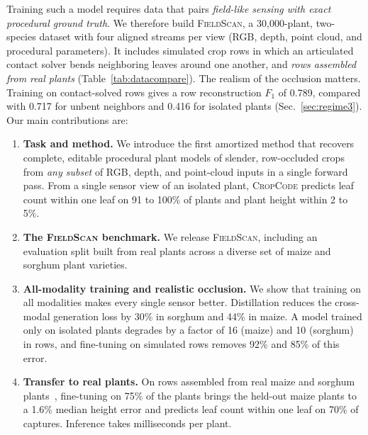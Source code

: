 \documentclass[10pt,twocolumn,letterpaper]{article}
\newcommand{\method}{\textsc{CropCode}}
\newcommand{\dataset}{\textsc{FieldScan}}
\begin{document}
Training such a model requires data that pairs \textit{field-like sensing with exact procedural ground truth}. We therefore build \dataset{}, a 30{,}000-plant, two-species dataset with four aligned streams per view (RGB, depth, point cloud, and procedural parameters). It includes simulated crop rows in which an articulated contact solver bends neighboring leaves around one another, and \textit{rows assembled from real plants }(Table~\ref{tab:datacompare}). The realism of the occlusion matters. Training on contact-solved rows gives a row reconstruction $F_1$ of 0.789, compared with 0.717 for unbent neighbors and 0.416 for isolated plants (Sec.~\ref{sec:regime3}). Our main contributions are:
\begin{enumerate}
  \item \textbf{Task and method.} We introduce the first amortized method that recovers complete, editable procedural plant models of slender, row-occluded crops from \emph{any subset} of RGB, depth, and point-cloud inputs in a single forward pass. From a single sensor view of an isolated plant, \method{} predicts leaf count within one leaf on 91 to 100\% of plants and plant height within 2 to 5\%.
  \item \textbf{The \dataset{} benchmark.} We release \dataset{}, including an evaluation split built from real plants across a diverse set of maize and sorghum plant varieties.
  \item \textbf{All-modality training and realistic occlusion.} We show that training on all modalities makes every single sensor better. Distillation reduces the cross-modal generation loss by 30\% in sorghum and 44\% in maize. A model trained only on isolated plants degrades by a factor of 16 (maize) and 10 (sorghum) in rows, and fine-tuning on simulated rows removes 92\% and 85\% of this error.
  \item \textbf{Transfer to real plants.} On rows assembled from real maize and sorghum plants~\citep{maizefield3d2025}, fine-tuning on 75\% of the plants brings the held-out maize plants to a 1.6\% median height error and predicts leaf count within one leaf on 70\% of captures. Inference takes milliseconds per plant.
\end{enumerate}

\end{document}

